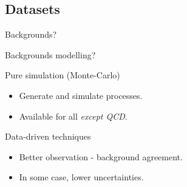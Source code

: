 %

%

\subsection*{Datasets}
%

\begin{frame}
\begin{center}
\LARGE Backgrounds?
\end{center}
\end{frame}
\addtocounter{framenumber}{-1}



\begin{frame}
\begin{center}
\LARGE Backgrounds modelling?
\end{center}

\begin{minipage}[t]{.45\textwidth}
\begin{block}{Pure simulation (Monte-Carlo)}
\begin{itemize}
\item Generate and simulate processes.
\item Available for all \emph{except QCD}.
\end{itemize}
\end{block}
\end{minipage}
\hfill
\begin{minipage}[t]{.45\textwidth}
\begin{block}{Data-driven techniques}
\begin{itemize}
\item Better observation - background agreement.
\item In some case, lower uncertainties.
\end{itemize}
\end{block}
\end{minipage}
\end{frame}

